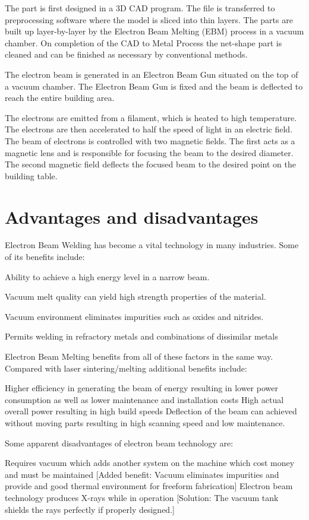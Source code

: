 \documentclass[10pt]{article}
\begin{document}
The part is first designed in a 3D CAD program. The file is transferred to preprocessing software where the model is sliced into thin layers. The parts are built up layer-by-layer by the Electron Beam Melting (EBM) process in a vacuum chamber. On completion of the CAD to Metal Process the net-shape part is cleaned and can be finished as necessary by conventional methods.

The electron beam is generated in an Electron Beam Gun situated on the top of a vacuum chamber. The Electron Beam Gun is fixed and the beam is deflected to reach the entire building area.

The electrons are emitted from a filament, which is heated to high temperature. The electrons are then accelerated to half the speed of light in an electric field. The beam of electrons is controlled with two magnetic fields. The first acts as a magnetic lens and is responsible for focusing the beam to the desired diameter. The second magnetic field deflects the focused beam to the desired point on the building table.

\section*{Advantages and disadvantages}
Electron Beam Welding has become a vital technology in many industries. Some of its benefits include:

Ability to achieve a high energy level in a narrow beam.

Vacuum melt quality can yield high strength properties of the material.

Vacuum environment eliminates impurities such as oxides and nitrides.

Permits welding in refractory metals and combinations of dissimilar metals

Electron Beam Melting benefits from all of these factors in the same way. Compared with laser sintering/melting additional benefits include:

Higher efficiency in generating the beam of energy resulting in lower power consumption as well as lower maintenance and installation costs High actual overall power resulting in high build speeds Deflection of the beam can achieved without moving parts resulting in high scanning speed and low maintenance.

Some apparent disadvantages of electron beam technology are:

Requires vacuum which adds another system on the machine which cost money and must be maintained [Added benefit: Vacuum eliminates impurities and provide and good thermal environment for freeform fabrication] Electron beam technology produces X-rays while in operation [Solution: The vacuum tank shields the rays perfectly if properly designed.]
\end{document}
